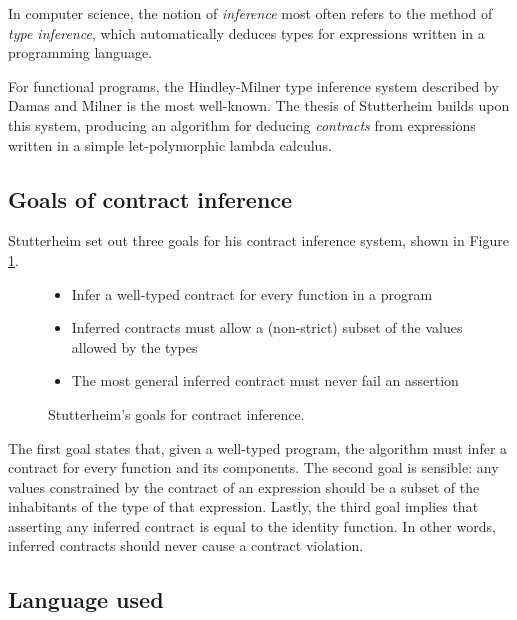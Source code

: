 \documentclass[10pt]{report}
\begin{document}
In computer science, the notion of \textit{inference} most often refers to the method of \textit{type inference}, which automatically deduces types for expressions written in a programming language.

For functional programs, the Hindley-Milner type inference system described by Damas and Milner \cite{Damas:1982ve} is the most well-known.
The thesis of Stutterheim \cite{Stutterheim:2013:thesis} builds upon this system, producing an algorithm for deducing \textit{contracts} from expressions written in a simple let-polymorphic lambda calculus.

\subsection{Goals of contract inference}
Stutterheim set out three goals for his contract inference system, shown in Figure \ref{fig:goals-stutterheim-contract-inference}.

\begin{figure}[htps]
\begin{framed}
\begin{center}
\begin{itemize}
	\item Infer a well-typed contract for every function in a program
	\item Inferred contracts must allow a (non-strict) subset of the values allowed
by the types
	\item The most general inferred contract must never fail an assertion
\end{itemize}
\end{center}
\end{framed}
\caption{\label{fig:goals-stutterheim-contract-inference}Stutterheim's goals for contract inference.}
\end{figure}

The first goal states that, given a well-typed program, the algorithm must infer a contract for every function and its components.
The second goal is sensible: any values constrained by the contract of an expression should be a subset of the inhabitants of the type of that expression.
Lastly, the third goal implies that asserting any inferred contract is equal to the identity function.
In other words, inferred contracts should never cause a contract violation.

\subsection{Language used}
\end{document}
